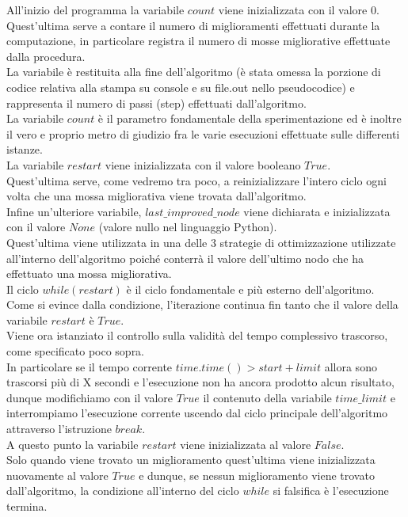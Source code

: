 All'inizio del programma la variabile $count$ viene inizializzata con il valore 0.\\
Quest'ultima serve a contare il numero di miglioramenti effettuati durante la computazione, in particolare registra il numero di mosse migliorative effettuate dalla procedura.\\
La variabile è restituita alla fine dell'algoritmo (è stata omessa la porzione di codice relativa alla stampa su console e su file.out nello pseudocodice) e rappresenta il numero di passi (step) effettuati dall'algoritmo.\\
La variabile $count$ è il parametro fondamentale della sperimentazione ed è inoltre il vero e proprio metro di giudizio fra le varie esecuzioni effettuate sulle differenti istanze.\\

La variabile $restart$ viene inizializzata con il valore booleano $True$.\\
Quest'ultima serve, come vedremo tra poco, a reinizializzare l'intero ciclo ogni volta che una mossa migliorativa viene trovata dall'algoritmo.\\

Infine un'ulteriore variabile, $last\_improved\_node$ viene dichiarata e inizializzata con il valore $None$ (valore nullo nel linguaggio Python).\\
Quest'ultima viene utilizzata in una delle 3 strategie di ottimizzazione utilizzate all'interno dell'algoritmo poiché conterrà il valore dell'ultimo nodo che ha effettuato una mossa migliorativa.\\

Il ciclo $while(restart)$ è il ciclo fondamentale e più esterno dell'algoritmo.\\
Come si evince dalla condizione, l'iterazione continua fin tanto che il valore della variabile $restart$ è $True$.\\

Viene ora istanziato il controllo sulla validità del tempo complessivo trascorso, come specificato poco sopra.\\
In particolare se il tempo corrente $time.time() > start + limit$ allora sono trascorsi più di X secondi e l'esecuzione non ha ancora prodotto alcun risultato, dunque modifichiamo con il valore $True$ il contenuto della variabile $time\_limit$ e interrompiamo l'esecuzione corrente uscendo dal ciclo principale dell'algoritmo attraverso l'istruzione $break$.\\

A questo punto la variabile $restart$ viene inizializzata al valore $False$.\\
Solo quando viene trovato un miglioramento quest'ultima viene inizializzata nuovamente al valore $True$ e dunque, se nessun miglioramento viene trovato dall'algoritmo, la condizione all'interno del ciclo $while$ si falsifica è l'esecuzione termina.

